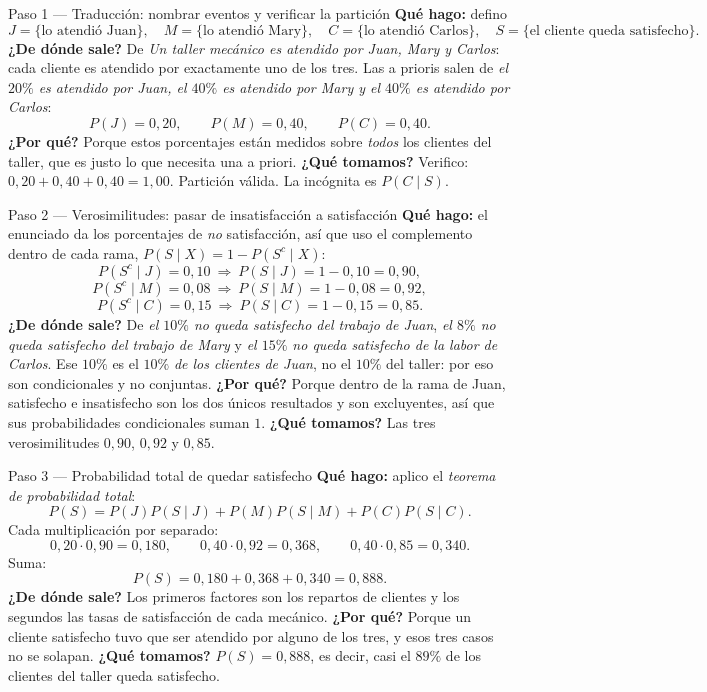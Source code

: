 \documentclass[11pt]{article}
\begin{document}
\begin{sol}

\begin{paso}{Paso 1 --- Traducción: nombrar eventos y verificar la partición}
\textbf{Qué hago:} defino
\[
J=\{\text{lo atendió Juan}\},\quad M=\{\text{lo atendió Mary}\},\quad C=\{\text{lo atendió Carlos}\},\quad S=\{\text{el cliente queda satisfecho}\}.
\]
\textbf{¿De dónde sale?} De \emph{Un taller mecánico es atendido por Juan, Mary y Carlos}: cada cliente es atendido por exactamente uno de los tres. Las a prioris salen de \emph{el $20\%$ es atendido por Juan, el $40\%$ es atendido por Mary y el $40\%$ es atendido por Carlos}:
\[
P(J)=0,20,\qquad P(M)=0,40,\qquad P(C)=0,40.
\]
\textbf{¿Por qué?} Porque estos porcentajes están medidos sobre \emph{todos} los clientes del taller, que es justo lo que necesita una a priori.
\textbf{¿Qué tomamos?} Verifico: $0,20+0,40+0,40=1,00$. Partición válida. La incógnita es $P(C\mid S)$.
\end{paso}

\begin{paso}{Paso 2 --- Verosimilitudes: pasar de insatisfacción a satisfacción}
\textbf{Qué hago:} el enunciado da los porcentajes de \emph{no} satisfacción, así que uso el complemento dentro de cada rama, $P(S\mid X)=1-P(S^{c}\mid X)$:
\[
P(S^{c}\mid J)=0,10\ \Rightarrow\ P(S\mid J)=1-0,10=0,90,
\]
\[
P(S^{c}\mid M)=0,08\ \Rightarrow\ P(S\mid M)=1-0,08=0,92,
\]
\[
P(S^{c}\mid C)=0,15\ \Rightarrow\ P(S\mid C)=1-0,15=0,85.
\]
\textbf{¿De dónde sale?} De \emph{el $10\%$ no queda satisfecho del trabajo de Juan}, \emph{el $8\%$ no queda satisfecho del trabajo de Mary} y \emph{el $15\%$ no queda satisfecho de la labor de Carlos}. Ese $10\%$ es el $10\%$ \emph{de los clientes de Juan}, no el $10\%$ del taller: por eso son condicionales y no conjuntas.
\textbf{¿Por qué?} Porque dentro de la rama de Juan, satisfecho e insatisfecho son los dos únicos resultados y son excluyentes, así que sus probabilidades condicionales suman $1$.
\textbf{¿Qué tomamos?} Las tres verosimilitudes $0,90$, $0,92$ y $0,85$.
\end{paso}

\begin{paso}{Paso 3 --- Probabilidad total de quedar satisfecho}
\textbf{Qué hago:} aplico el \emph{teorema de probabilidad total}:
\[
P(S)=P(J)P(S\mid J)+P(M)P(S\mid M)+P(C)P(S\mid C).
\]
Cada multiplicación por separado:
\[
0,20\cdot 0,90=0,180,\qquad 0,40\cdot 0,92=0,368,\qquad 0,40\cdot 0,85=0,340.
\]
Suma:
\[
P(S)=0,180+0,368+0,340=0,888.
\]
\textbf{¿De dónde sale?} Los primeros factores son los repartos de clientes y los segundos las tasas de satisfacción de cada mecánico.
\textbf{¿Por qué?} Porque un cliente satisfecho tuvo que ser atendido por alguno de los tres, y esos tres casos no se solapan.
\textbf{¿Qué tomamos?} $P(S)=0,888$, es decir, casi el $89\%$ de los clientes del taller queda satisfecho.
\end{paso}


\end{sol}
\end{document}
